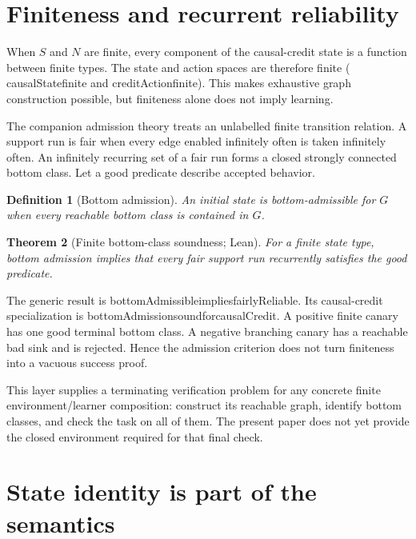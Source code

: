 \documentclass[11pt]{article}
\newtheorem{theorem}{Theorem}[section]
\newtheorem{definition}[theorem]{Definition}
\newcommand{\leanname}[1]{{\scriptsize\ttfamily
  \def\_{\textunderscore\allowbreak}#1}}
\begin{document}
\section{Finiteness and recurrent reliability}
\label{sec:finite}

When $S$ and $N$ are finite, every component of the causal-credit state is a
function between finite types.  The state and action spaces are therefore
finite (\leanname{causalState\_finite} and \leanname{creditAction\_finite}).
This makes exhaustive graph construction possible, but finiteness alone does
not imply learning.

The companion admission theory treats an unlabelled finite transition
relation.  A support run is fair when every edge enabled infinitely often is
taken infinitely often.  An infinitely recurring set of a fair run forms a
closed strongly connected bottom class.  Let a good predicate describe
accepted behavior.

\begin{definition}[Bottom admission]
An initial state is bottom-admissible for $G$ when every reachable bottom
class is contained in $G$.
\end{definition}

\begin{theorem}[Finite bottom-class soundness; Lean]
For a finite state type, bottom admission implies that every fair support run
recurrently satisfies the good predicate.
\end{theorem}

The generic result is
\leanname{bottomAdmissible\_implies\_fairlyReliable}.
Its causal-credit specialization is
\leanname{bottomAdmission\_sound\_for\_causalCredit}.  A positive finite canary
has one good terminal bottom class.  A negative branching canary has a
reachable bad sink and is rejected.  Hence the admission criterion does not
turn finiteness into a vacuous success proof.

This layer supplies a terminating verification problem for any concrete
finite environment/learner composition: construct its reachable graph,
identify bottom classes, and check the task on all of them.  The present paper
does not yet provide the closed environment required for that final check.

\section{State identity is part of the semantics}
\label{sec:identity}
\end{document}
